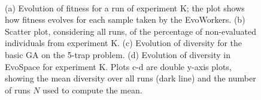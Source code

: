 \begin{figure}[t]
    \centering
    \\
    \caption{
    (a) Evolution of fitness for a run of experiment K; the plot shows how fitness evolves for each sample taken by the EvoWorkers.
    (b) Scatter plot, considering all runs, of the percentage of non-evaluated individuals from experiment K.
    (c) Evolution of diversity for the basic GA on the 5-trap problem.
    (d) Evolution of diversity in EvoSpace for experiment K.
    Plots c-d are double y-axis plots, showing the mean diversity over all runs (dark line) and the number of runs $N$ used to compute the mean.}
    \label{fig:others}
\end{figure}

